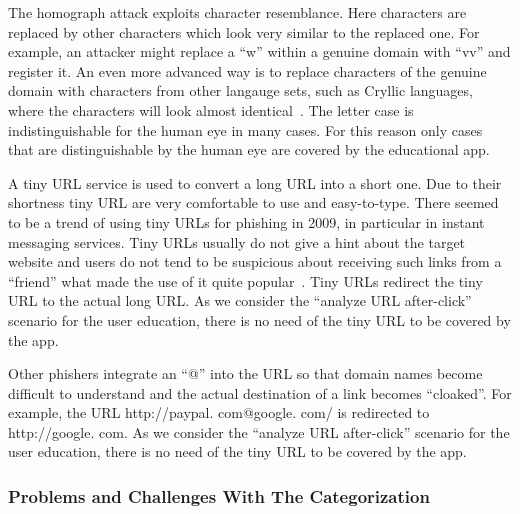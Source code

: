 \begin{description}[leftmargin=0cm]
	\item[Homograph Attack] The homograph attack exploits character resemblance.
 Here characters are replaced by other characters which look very similar to the replaced one.
 For example, an attacker might replace a ``w'' within a genuine domain with ``vv'' and register it.
 An even more advanced way is to replace characters of the genuine domain with characters from other langauge sets, such as Cryllic languages, where the characters will look almost identical~\cite{gabrilovich2002homograph}. The letter case is indistinguishable for the human eye in many cases.
 For this reason only cases that are distinguishable by the human eye are covered by the educational app.

	\item[Tiny URLs] A tiny URL service is used to convert a long URL into a short one.
 Due to their shortness tiny URL are very comfortable to use and easy-to-type.
 There seemed to be a trend of using tiny URLs for phishing in 2009, in particular in instant messaging services.
 Tiny URLs usually do not give a hint about the target website and users do not tend to be suspicious about receiving such links from a ``friend'' what made the use of it quite popular~\cite{tinyurlpcworld}. Tiny URLs redirect the tiny URL to the actual long URL.
 As we consider the ``analyze URL after-click'' scenario for the user education, there is no need of the tiny URL to be covered by the app.

		\item[Cloaked URLs] Other phishers integrate an ``@'' into the URL so that domain names become difficult to understand and the actual destination of a link becomes ``cloaked''\cite{alnajim2009fighting}. For example, the URL http://paypal.
com@google.
com/ is redirected to http://google.
com.
 As we consider the ``analyze URL after-click'' scenario for the user education, there is no need of the tiny URL to be covered by the app.

\end{description}

\subsubsection{Problems and Challenges With The Categorization}

